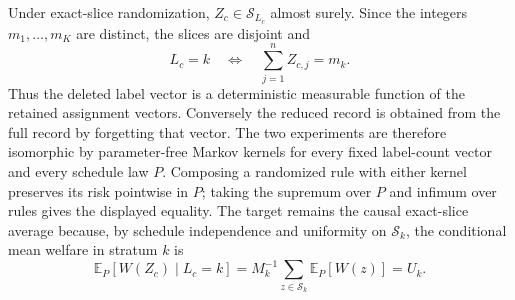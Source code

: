 Under exact-slice randomization, \(Z_c\in\mathcal S_{L_c}\) almost surely.  Since the integers \(m_1,\ldots,m_K\) are distinct, the slices are disjoint and
\[
 L_c=k\quad\Longleftrightarrow\quad \sum_{j=1}^n Z_{c,j}=m_k.
\]
Thus the deleted label vector is a deterministic measurable function of the retained assignment vectors.  Conversely the reduced record is obtained from the full record by forgetting that vector.  The two experiments are therefore isomorphic by parameter-free Markov kernels for every fixed label-count vector and every schedule law \(P\).  Composing a randomized rule with either kernel preserves its risk pointwise in \(P\); taking the supremum over \(P\) and infimum over rules gives the displayed equality.  The target remains the causal exact-slice average because, by schedule independence and uniformity on \(\mathcal S_k\), the conditional mean welfare in stratum \(k\) is
\[
 \mathbb E_P[W(Z_c)\mid L_c=k]=M_k^{-1}\sum_{z\in\mathcal S_k}\mathbb E_P[W(z)]=U_k.
\]